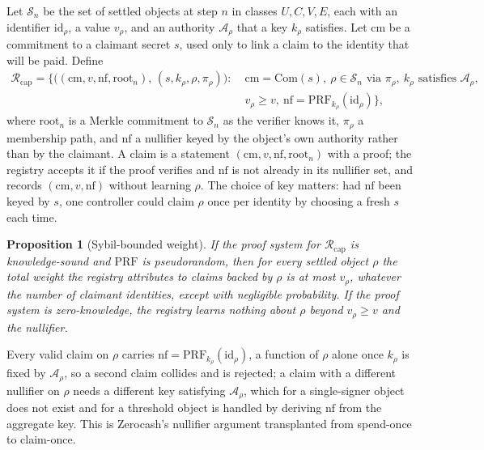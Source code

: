 \documentclass[11pt]{article}
\theoremstyle{plain}
\newtheorem{proposition}{Proposition}
\theoremstyle{definition}
\theoremstyle{remark}
\newcommand{\Rcap}{\mathcal{R}_{\mathrm{cap}}}
\newcommand{\sett}{\mathcal{S}}
\newcommand{\auth}{\mathcal{A}}
\begin{document}
Let $\sett_n$ be the set of settled objects at step $n$ in classes $U,C,V,E$, each with an identifier $\mathrm{id}_\rho$, a value $v_\rho$, and an authority $\auth_\rho$ that a key $k_\rho$ satisfies. Let $\mathrm{cm}$ be a commitment to a claimant secret $s$, used only to link a claim to the identity that will be paid. Define
\begin{equation*}
\begin{aligned}
\Rcap=\Big\{\big((\mathrm{cm},v,\mathrm{nf},\mathrm{root}_n),\,(s,k_\rho,\rho,\pi_\rho)\big):\;&
\mathrm{cm}=\mathrm{Com}(s),\ \rho\in\sett_n\text{ via }\pi_\rho,\ k_\rho\text{ satisfies }\auth_\rho,\\
&v_\rho\ge v,\ \mathrm{nf}=\mathrm{PRF}_{k_\rho}(\mathrm{id}_\rho)\Big\},
\end{aligned}
\end{equation*}
where $\mathrm{root}_n$ is a Merkle commitment to $\sett_n$ as the verifier knows it, $\pi_\rho$ a membership path, and $\mathrm{nf}$ a nullifier keyed by the object's own authority rather than by the claimant. A claim is a statement $(\mathrm{cm},v,\mathrm{nf},\mathrm{root}_n)$ with a proof; the registry accepts it if the proof verifies and $\mathrm{nf}$ is not already in its nullifier set, and records $(\mathrm{cm},v,\mathrm{nf})$ without learning $\rho$. The choice of key matters: had $\mathrm{nf}$ been keyed by $s$, one controller could claim $\rho$ once per identity by choosing a fresh $s$ each time.

\begin{proposition}[Sybil-bounded weight]
\label{prop:sybil}
If the proof system for $\Rcap$ is knowledge-sound and $\mathrm{PRF}$ is pseudorandom, then for every settled object $\rho$ the total weight the registry attributes to claims backed by $\rho$ is at most $v_\rho$, whatever the number of claimant identities, except with negligible probability. If the proof system is zero-knowledge, the registry learns nothing about $\rho$ beyond $v_\rho\ge v$ and the nullifier.
\end{proposition}

Every valid claim on $\rho$ carries $\mathrm{nf}=\mathrm{PRF}_{k_\rho}(\mathrm{id}_\rho)$, a function of $\rho$ alone once $k_\rho$ is fixed by $\auth_\rho$, so a second claim collides and is rejected; a claim with a different nullifier on $\rho$ needs a different key satisfying $\auth_\rho$, which for a single-signer object does not exist and for a threshold object is handled by deriving $\mathrm{nf}$ from the aggregate key. This is Zerocash's nullifier argument \citep{bensasson2014zerocash} transplanted from spend-once to claim-once.
\end{document}
